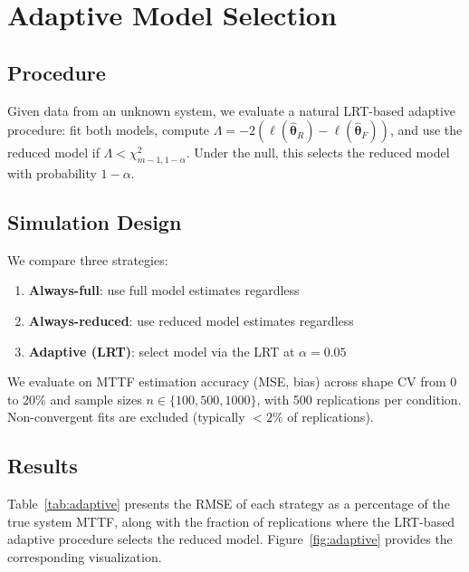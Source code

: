 \documentclass[11pt]{article}
\renewcommand{\v}[1]{\boldsymbol{#1}}
\begin{document}
\section{Adaptive Model Selection}
\label{sec:adaptive}

\subsection{Procedure}

Given data from an unknown system, we evaluate a natural LRT-based adaptive procedure: fit both models, compute $\Lambda = -2(\ell(\hat{\v\theta}_R) - \ell(\hat{\v\theta}_F))$, and use the reduced model if $\Lambda < \chi^2_{m-1, 1-\alpha}$. Under the null, this selects the reduced model with probability $1 - \alpha$.

\subsection{Simulation Design}

We compare three strategies:
\begin{enumerate}
\item \textbf{Always-full}: use full model estimates regardless
\item \textbf{Always-reduced}: use reduced model estimates regardless
\item \textbf{Adaptive (LRT)}: select model via the LRT at $\alpha = 0.05$
\end{enumerate}

We evaluate on MTTF estimation accuracy (MSE, bias) across shape CV from 0 to 20\% and sample sizes $n \in \{100, 500, 1000\}$, with 500 replications per condition. Non-convergent fits are excluded (typically $< 2\%$ of replications).

\subsection{Results}

Table~\ref{tab:adaptive} presents the RMSE of each strategy as a percentage of the true system MTTF, along with the fraction of replications where the LRT-based adaptive procedure selects the reduced model. Figure~\ref{fig:adaptive} provides the corresponding visualization.
\end{document}
